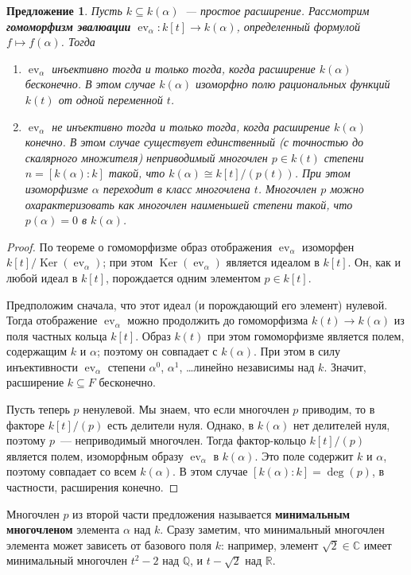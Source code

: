 \documentclass[a4paper,11pt]{scrartcl}
\theoremstyle{plain}
\newtheorem{proposition}[theorem]{Предложение}
\theoremstyle{definition}
\newcommand\dfn[1]{\textbf{#1}}
\newcommand\mb{\mathbb}
\newcommand\isom{\cong}
\newcommand\sseq{\subseteq}
\newcommand\ev{{\operatorname{ev}}}
\newcommand\Ker{\operatorname{Ker}}
\begin{document}
\begin{proposition}\label{alg_or_trans}
Пусть $k\sseq k(\alpha)$~--- простое расширение. Рассмотрим
\dfn{гомоморфизм эвалюации} $\ev_\alpha\colon k[t]\to k(\alpha)$,
определенный формулой $f\mapsto f(\alpha)$. Тогда
\begin{enumerate}
\item $\ev_\alpha$ инъективно тогда и только тогда, когда расширение
  $k(\alpha)$ бесконечно. В этом случае $k(\alpha)$ изоморфно полю
  рациональных функций $k(t)$ от одной переменной $t$.
\item $\ev_\alpha$ не инъективно тогда и только тогда, когда расширение
  $k(\alpha)$ конечно. В этом случае существует единственный (с
  точностью до скалярного множителя)
  неприводимый многочлен $p\in k(t)$ степени $n=[k(\alpha):k]$ такой,
  что $k(\alpha)\isom k[t]/(p(t))$. При этом изоморфизме $\alpha$
  переходит в класс многочлена $t$. Многочлен $p$ можно
  охарактеризовать как многочлен наименьшей степени такой, что
  $p(\alpha)=0$ в $k(\alpha)$.
\end{enumerate}
\end{proposition}
\begin{proof}
По теореме о гомоморфизме образ отображения $\ev_\alpha$ изоморфен
$k[t]/\Ker(\ev_\alpha)$; при этом $\Ker(\ev_\alpha)$ является идеалом
в $k[t]$. Он, как и любой идеал в $k[t]$, порождается одним элементом
$p\in k[t]$.

Предположим сначала, что этот идеал (и порождающий его элемент)
нулевой.
Тогда отображение $\ev_\alpha$ можно продолжить до гомоморфизма
$k(t)\to k(\alpha)$ из поля частных кольца $k[t]$. Образ $k(t)$ при
этом гомоморфизме является полем, содержащим $k$ и $\alpha$; поэтому
он совпадает с $k(\alpha)$. При этом в силу инъективности $\ev_\alpha$
степени $\alpha^0$, $\alpha^1$, \dots линейно независимы над
$k$. Значит, расширение $k\sseq F$ бесконечно.

Пусть теперь $p$ ненулевой.
Мы знаем, что если многочлен $p$ приводим, то в факторе
$k[t]/(p)$ есть делители нуля. Однако, в $k(\alpha)$ нет делителей
нуля, поэтому $p$~--- неприводимый многочлен.
Тогда фактор-кольцо $k[t]/(p)$ является полем, изоморфным образу
$\ev_\alpha$ в $k(\alpha)$. Это поле содержит $k$ и $\alpha$, поэтому
совпадает со всем $k(\alpha)$. В этом случае $[k(\alpha):k]=\deg(p)$,
в частности, расширения конечно.
\end{proof}

Многочлен $p$ из второй части предложения называется \dfn{минимальным
  многочленом} элемента $\alpha$ над $k$. Сразу заметим, что
минимальный многочлен элемента может зависеть от базового поля $k$:
например, элемент $\sqrt{2}\in\mb C$ имеет минимальный многочлен
$t^2-2$ над $\mb Q$, и $t-\sqrt{2}$ над $\mb R$.
\end{document}
